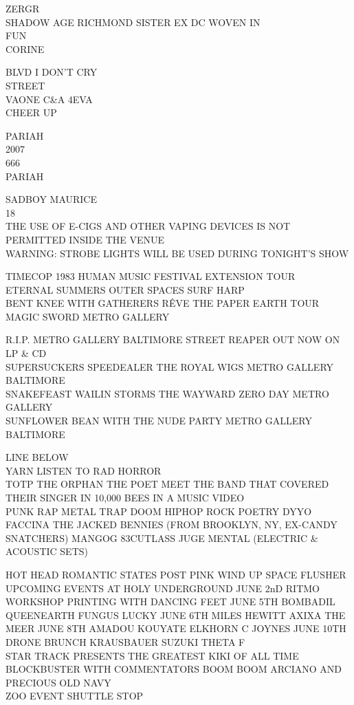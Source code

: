 \documentclass[10pt,letterpaper]{article}
\begin{document}
ZERGR\\
SHADOW AGE RICHMOND SISTER EX DC WOVEN IN\\
FUN\\
CORINE

BLVD I DON'T CRY\\
STREET\\
VAONE C\&A 4EVA\\
CHEER UP

PARIAH\\
2007\\
666\\
PARIAH

SADBOY MAURICE\\
18\\
THE USE OF E{-}CIGS AND OTHER VAPING DEVICES IS NOT PERMITTED INSIDE THE VENUE\\
WARNING: STROBE LIGHTS WILL BE USED DURING TONIGHT'S SHOW

TIMECOP 1983 HUMAN MUSIC FESTIVAL EXTENSION TOUR\\
ETERNAL SUMMERS OUTER SPACES SURF HARP\\
BENT KNEE WITH GATHERERS RÊVE THE PAPER EARTH TOUR\\
MAGIC SWORD METRO GALLERY

R.I.P. METRO GALLERY BALTIMORE STREET REAPER OUT NOW ON LP \& CD\\
SUPERSUCKERS SPEEDEALER THE ROYAL WIGS METRO GALLERY BALTIMORE\\
SNAKEFEAST WAILIN STORMS THE WAYWARD ZERO DAY METRO GALLERY\\
SUNFLOWER BEAN WITH THE NUDE PARTY METRO GALLERY BALTIMORE

LINE BELOW\\
YARN LISTEN TO RAD HORROR\\
TOTP THE ORPHAN THE POET MEET THE BAND THAT COVERED THEIR SINGER IN 10,000 BEES IN A MUSIC VIDEO\\
PUNK RAP METAL TRAP DOOM HIPHOP ROCK POETRY DYYO FACCINA THE JACKED BENNIES (FROM BROOKLYN, NY, EX{-}CANDY SNATCHERS) MANGOG 83CUTLASS JUGE MENTAL (ELECTRIC \& ACOUSTIC SETS)

HOT HEAD ROMANTIC STATES POST PINK WIND UP SPACE FLUSHER\\
UPCOMING EVENTS AT HOLY UNDERGROUND JUNE 2nD RITMO WORKSHOP PRINTING WITH DANCING FEET JUNE 5TH BOMBADIL QUEENEARTH FUNGUS LUCKY JUNE 6TH MILES HEWITT AXIXA THE MEER JUNE 8TH AMADOU KOUYATE ELKHORN C JOYNES JUNE 10TH DRONE BRUNCH KRAUSBAUER SUZUKI THETA F\\
STAR TRACK PRESENTS THE GREATEST KIKI OF ALL TIME BLOCKBUSTER WITH COMMENTATORS BOOM BOOM ARCIANO AND PRECIOUS OLD NAVY\\
ZOO EVENT SHUTTLE STOP
\end{document}

